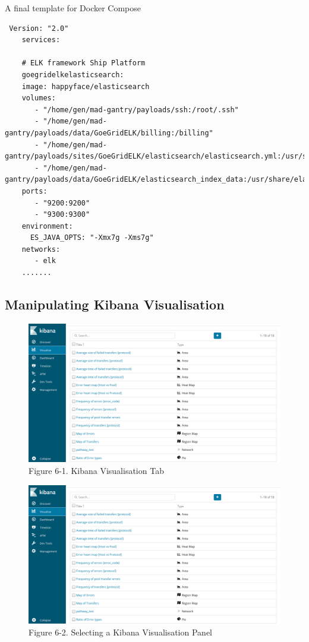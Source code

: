 \documentclass[]{article}
\begin{document}
A final template for Docker Compose

\begin{verbatim}
 Version: "2.0"
    services:
    
    # ELK framework Ship Platform
    goegridelkelasticsearch:
    image: happyface/elasticsearch
    volumes:
       - "/home/gen/mad-gantry/payloads/ssh:/root/.ssh"
       - "/home/gen/mad-gantry/payloads/data/GoeGridELK/billing:/billing"
       - "/home/gen/mad-gantry/payloads/sites/GoeGridELK/elasticsearch/elasticsearch.yml:/usr/share/elasticsearch/config/elasticsearch.yml"
       - "/home/gen/mad-gantry/payloads/data/GoeGridELK/elasticsearch_index_data:/usr/share/elasticsearch/data"
    ports:
       - "9200:9200"
       - "9300:9300"
    environment:
      ES_JAVA_OPTS: "-Xmx7g -Xms7g"
    networks:
       - elk
    .......
\end{verbatim}

\subsection{Manipulating Kibana
Visualisation}\label{manipulating-kibana-visualisation}

\begin{figure}[htbp]
\centering
\includegraphics{images/kibana_vis1.png}
\caption{Figure 6-1. Kibana Visualisation Tab}
\end{figure}

\begin{figure}[htbp]
\centering
\includegraphics{images/kibana_vis1.png}
\caption{Figure 6-2. Selecting a Kibana Visualisation Panel}
\end{figure}
\end{document}

